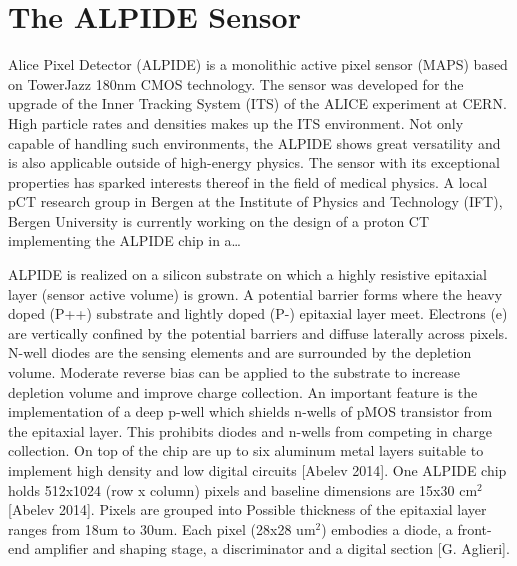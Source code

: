 \chapter{The ALPIDE Sensor}

Alice Pixel Detector (ALPIDE) is a monolithic active pixel sensor (MAPS) based on TowerJazz 180nm CMOS technology. The sensor was developed for the upgrade of the Inner Tracking System (ITS) of the ALICE experiment at CERN. High particle rates and densities makes up the ITS environment. Not only capable of handling such environments, the ALPIDE shows great versatility and is also applicable outside of high-energy physics.
The sensor with its exceptional properties has sparked interests thereof in the field of medical physics. A local pCT research group in Bergen at the Institute of Physics and Technology (IFT), Bergen University is currently working on the design of a proton CT implementing the ALPIDE chip in a…

ALPIDE is realized on a silicon substrate on which a highly resistive epitaxial layer (sensor active volume) is grown. A potential barrier forms where the heavy doped (P++) substrate and lightly doped (P-) epitaxial layer meet. Electrons (e) are vertically confined by the potential barriers and diffuse laterally across pixels. N-well diodes are the sensing elements and are surrounded by the depletion volume. Moderate reverse bias can be applied to the substrate to increase depletion volume and improve charge collection.
An important feature is the implementation of a deep p-well which shields n-wells of pMOS transistor from the epitaxial layer. This prohibits diodes and n-wells from competing in charge collection.
On top of the chip are up to six aluminum metal layers suitable to implement high density and low digital circuits [Abelev 2014].
One ALPIDE chip holds 512x1024 (row x column) pixels and baseline dimensions are 15x30 cm$^2$ [Abelev 2014]. Pixels are grouped into
Possible thickness of the epitaxial layer ranges from 18um to 30um. Each pixel (28x28 um$^2$) embodies a diode, a front-end amplifier and shaping stage, a discriminator and a digital section [G. Aglieri].
